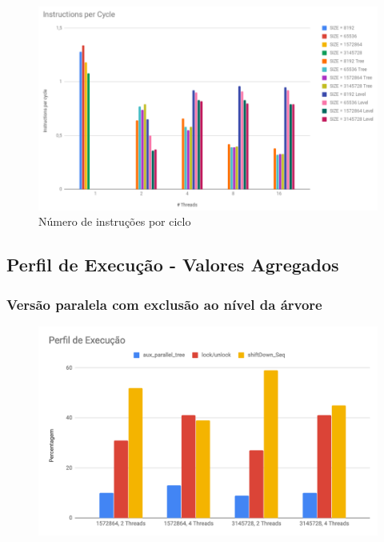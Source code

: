 \documentclass{article}
\begin{document}
\begin{appendices}
\begin{figure}[H]
    \centering
    \includegraphics[width=18cm]{Pictures/InstPerCycle.png}
    \caption{Número de instruções por ciclo}
    \label{fig:inst_per_cycle}
\end{figure}
\end{appendices}

\subsection{Perfil de Execução - Valores Agregados}

\subsubsection{Versão paralela com exclusão ao nível da árvore}
\begin{figure}[H]
    \centering
    \includegraphics[width=15cm]{Pictures/ExecProfile_Tree.png}
    \label{fig:execprofile_tree}
\end{figure}
\end{document}

